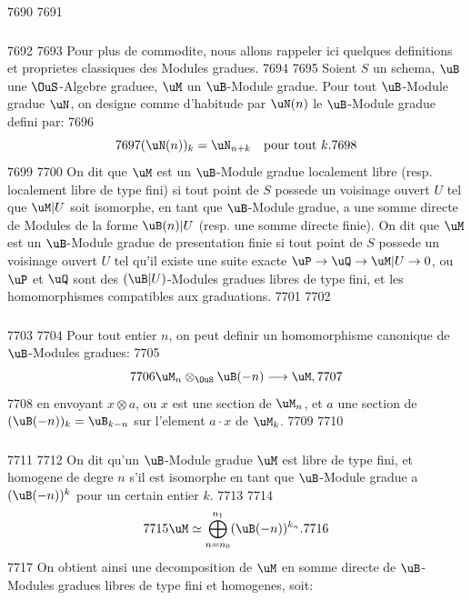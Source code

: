   7690	
  7691	\subsubsection{}
  7692	
  7693	Pour plus de commodite, nous allons rappeler ici quelques definitions et proprietes classiques des Modules gradues.
  7694	
  7695	Soient $S$ un schema, $\uB$ une $\OuS$-Algebre graduee, $\uM$ un $\uB$-Module gradue. Pour tout $\uB$-Module gradue $\uN$, on designe comme d'habitude par $\uN(n)$ le $\uB$-Module gradue defini par:
  7696	\[
  7697	(\uN(n))_k = \uN_{n+k} \quad \text{pour tout } k.
  7698	\]
  7699	
  7700	On dit que $\uM$ est un $\uB$-Module gradue localement libre (resp. localement libre de type fini) si tout point de $S$ possede un voisinage ouvert $U$ tel que $\uM|U$ soit isomorphe, en tant que $\uB$-Module gradue, a une somme directe de Modules de la forme $\uB(n)|U$ (resp. une somme directe finie). On dit que $\uM$ est un $\uB$-Module gradue de presentation finie si tout point de $S$ possede un voisinage ouvert $U$ tel qu'il existe une suite exacte $\uP \to \uQ \to \uM|U \to 0$, ou $\uP$ et $\uQ$ sont des $(\uB|U)$-Modules gradues libres de type fini, et les homomorphismes compatibles aux graduations.
  7701	
  7702	\subsubsection{}
  7703	
  7704	Pour tout entier $n$, on peut definir un homomorphisme canonique de $\uB$-Modules gradues:
  7705	\begin{equation}\label{eq:1.2.1}
  7706	\uM_n \otimes_{\OuS} \uB(-n) \longrightarrow \uM,
  7707	\end{equation}
  7708	en envoyant $x \otimes a$, ou $x$ est une section de $\uM_n$, et $a$ une section de $(\uB(-n))_k = \uB_{k-n}$ sur l'element $a \cdot x$ de $\uM_k$.
  7709	
  7710	\subsubsection{}
  7711	
  7712	On dit qu'un $\uB$-Module gradue $\uM$ est libre de type fini, et homogene de degre $n$ s'il est isomorphe en tant que $\uB$-Module gradue a $(\uB(-n))^k$ pour un certain entier $k$.
  7713	
  7714	\begin{equation}\label{eq:1.2.2}
  7715	\uM \simeq \bigoplus_{n=n_0}^{n_1} (\uB(-n))^{k_n}.
  7716	\end{equation}
  7717	On obtient ainsi une decomposition de $\uM$ en somme directe de $\uB$-Modules gradues libres de type fini et homogenes, soit:
